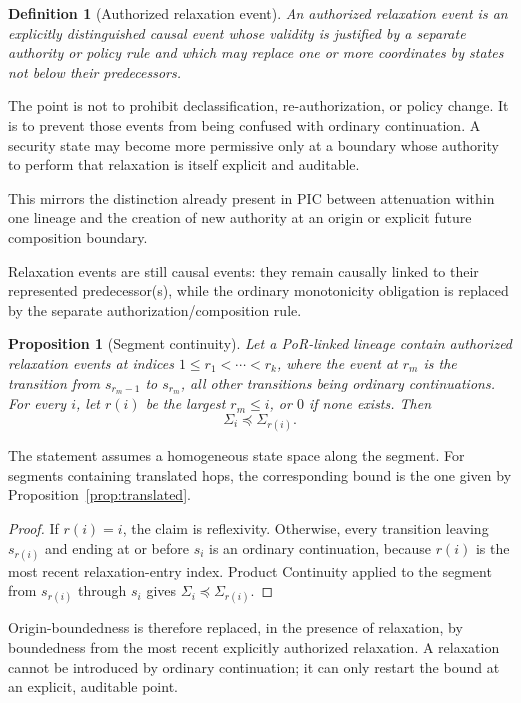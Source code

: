 \documentclass[10pt,twocolumn]{article}
\newcommand{\state}{\Sigma}
\newtheorem{definition}{Definition}
\newtheorem{proposition}{Proposition}
\begin{document}
\begin{definition}[Authorized relaxation event]
An authorized relaxation event is an explicitly distinguished causal event
whose validity is justified by a separate authority or policy rule and which
may replace one or more coordinates by states not below their predecessors.
\end{definition}

The point is not to prohibit declassification, re-authorization, or policy
change.  It is to prevent those events from being confused with ordinary
continuation.  A security state may become more permissive only at a boundary
whose authority to perform that relaxation is itself explicit and auditable.

This mirrors the distinction already present in PIC between attenuation within
one lineage and the creation of new authority at an origin or explicit future
composition boundary.

Relaxation events are still causal events: they remain causally linked to their
represented predecessor(s), while the ordinary monotonicity obligation is
replaced by the separate authorization/composition rule.

\begin{proposition}[Segment continuity]\label{prop:segment}
Let a PoR-linked lineage contain authorized relaxation events at indices
$1\le r_1<\cdots<r_k$, where the event at $r_m$ is the transition from
$s_{r_m-1}$ to $s_{r_m}$, all other transitions being ordinary
continuations. For every $i$, let $r(i)$ be the largest $r_m\le i$, or $0$
if none exists. Then
\begin{equation}
  \state_i\preceq\state_{r(i)}.
\end{equation}
\end{proposition}

The statement assumes a homogeneous state space along the segment. For segments
containing translated hops, the corresponding bound is the one given by
Proposition~\ref{prop:translated}.

\begin{proof}
If $r(i)=i$, the claim is reflexivity. Otherwise, every transition leaving
$s_{r(i)}$ and ending at or before $s_i$ is an ordinary continuation, because
$r(i)$ is the most recent relaxation-entry index. Product Continuity applied
to the segment from $s_{r(i)}$ through $s_i$ gives
$\state_i\preceq\state_{r(i)}$.
\end{proof}

Origin-boundedness is therefore replaced, in the presence of relaxation,
by boundedness from the most recent explicitly authorized relaxation. A
relaxation cannot be introduced by ordinary continuation; it can only
restart the bound at an explicit, auditable point.
\end{document}

